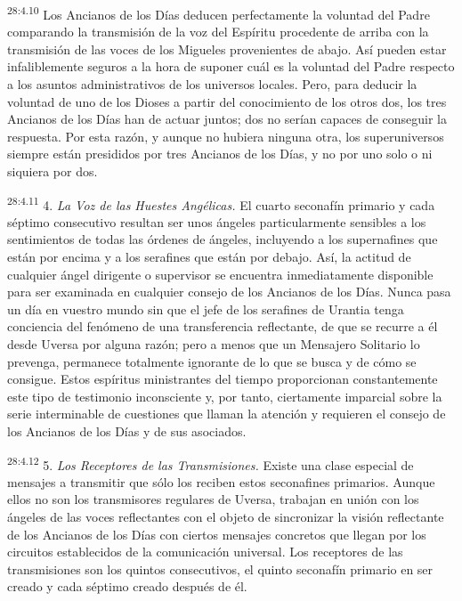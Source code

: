 \par
\textsuperscript{28:4.10} Los Ancianos de los Días deducen perfectamente la voluntad del Padre comparando la transmisión de la voz del Espíritu procedente de arriba con la transmisión de las voces de los Migueles provenientes de abajo. Así pueden estar infaliblemente seguros a la hora de suponer cuál es la voluntad del Padre respecto a los asuntos administrativos de los universos locales. Pero, para deducir la voluntad de uno de los Dioses a partir del conocimiento de los otros dos, los tres Ancianos de los Días han de actuar juntos; dos no serían capaces de conseguir la respuesta. Por esta razón, y aunque no hubiera ninguna otra, los superuniversos siempre están presididos por tres Ancianos de los Días, y no por uno solo o ni siquiera por dos.

\par
\textsuperscript{28:4.11} 4. \textit{La Voz de las Huestes Angélicas.} El cuarto seconafín primario y cada séptimo consecutivo resultan ser unos ángeles particularmente sensibles a los sentimientos de todas las órdenes de ángeles, incluyendo a los supernafines que están por encima y a los serafines que están por debajo. Así, la actitud de cualquier ángel dirigente o supervisor se encuentra inmediatamente disponible para ser examinada en cualquier consejo de los Ancianos de los Días. Nunca pasa un día en vuestro mundo sin que el jefe de los serafines de Urantia tenga conciencia del fenómeno de una transferencia reflectante, de que se recurre a él desde Uversa por alguna razón; pero a menos que un Mensajero Solitario lo prevenga, permanece totalmente ignorante de lo que se busca y de cómo se consigue. Estos espíritus ministrantes del tiempo proporcionan constantemente este tipo de testimonio inconsciente y, por tanto, ciertamente imparcial sobre la serie interminable de cuestiones que llaman la atención y requieren el consejo de los Ancianos de los Días y de sus asociados.

\par
\textsuperscript{28:4.12} 5. \textit{Los Receptores de las Transmisiones.} Existe una clase especial de mensajes a transmitir que sólo los reciben estos seconafines primarios. Aunque ellos no son los transmisores regulares de Uversa, trabajan en unión con los ángeles de las voces reflectantes con el objeto de sincronizar la visión reflectante de los Ancianos de los Días con ciertos mensajes concretos que llegan por los circuitos establecidos de la comunicación universal. Los receptores de las transmisiones son los quintos consecutivos, el quinto seconafín primario en ser creado y cada séptimo creado después de él.

